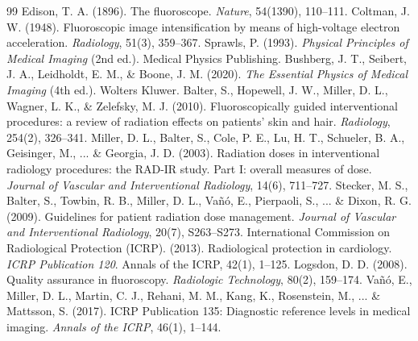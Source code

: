 \documentclass[11pt,a4paper]{article}
\begin{document}
\begin{thebibliography}{99}
 Edison, T. A. (1896). The fluoroscope. \textit{Nature}, 54(1390), 110--111.
 Coltman, J. W. (1948). Fluoroscopic image intensification by means of high-voltage electron acceleration. \textit{Radiology}, 51(3), 359--367.
 Sprawls, P. (1993). \textit{Physical Principles of Medical Imaging} (2nd ed.). Medical Physics Publishing.
 Bushberg, J. T., Seibert, J. A., Leidholdt, E. M., \& Boone, J. M. (2020). \textit{The Essential Physics of Medical Imaging} (4th ed.). Wolters Kluwer.
 Balter, S., Hopewell, J. W., Miller, D. L., Wagner, L. K., \& Zelefsky, M. J. (2010). Fluoroscopically guided interventional procedures: a review of radiation effects on patients' skin and hair. \textit{Radiology}, 254(2), 326--341.
 Miller, D. L., Balter, S., Cole, P. E., Lu, H. T., Schueler, B. A., Geisinger, M., ... \& Georgia, J. D. (2003). Radiation doses in interventional radiology procedures: the RAD-IR study. Part I: overall measures of dose. \textit{Journal of Vascular and Interventional Radiology}, 14(6), 711--727.
 Stecker, M. S., Balter, S., Towbin, R. B., Miller, D. L., Vañó, E., Pierpaoli, S., ... \& Dixon, R. G. (2009). Guidelines for patient radiation dose management. \textit{Journal of Vascular and Interventional Radiology}, 20(7), S263--S273.
 International Commission on Radiological Protection (ICRP). (2013). Radiological protection in cardiology. \textit{ICRP Publication 120}. Annals of the ICRP, 42(1), 1--125.
 Logsdon, D. D. (2008). Quality assurance in fluoroscopy. \textit{Radiologic Technology}, 80(2), 159--174.
 Vañó, E., Miller, D. L., Martin, C. J., Rehani, M. M., Kang, K., Rosenstein, M., ... \& Mattsson, S. (2017). ICRP Publication 135: Diagnostic reference levels in medical imaging. \textit{Annals of the ICRP}, 46(1), 1--144.
\end{thebibliography}
\end{document}
